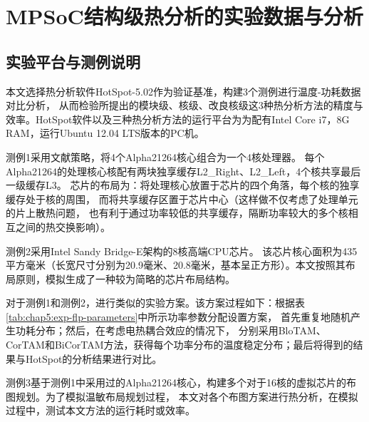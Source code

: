 

\chapter{MPSoC结构级热分析的实验数据与分析}
\label{cha:SSTAexperiments}

\section{实验平台与测例说明}
本文选择热分析软件HotSpot-5.02作为验证基准，构建3个测例进行温度-功耗数据对比分析， 从而检验所提出的模块级、核级、改良核级这3种热分析方法的精度与效率。HotSpot软件以及三种热分析方法的运行平台为为配有Intel Core i7，8G RAM，运行Ubuntu 12.04 LTS版本的PC机。

测例1采用文献策略，将4个Alpha21264核心组合为一个4核处理器。 每个Alpha21264的处理核心核配有两块独享缓存L2\_Right、L2\_Left，4个核共享最后一级缓存L3。 芯片的布局为：将处理核心放置于芯片的四个角落，每个核的独享缓存处于核的周围， 而将共享缓存区置于芯片中心（这样做不仅考虑了处理单元的片上散热问题， 也有利于通过功率较低的共享缓存，隔断功率较大的多个核相互之间的热交换影响）。

测例2采用Intel Sandy Bridge-E架构的8核高端CPU芯片。 该芯片核心面积为435平方毫米（长宽尺寸分别为20.9毫米、20.8毫米，基本呈正方形）。本文按照其布局原则，模拟生成了一种较为简略的芯片布局结构。

对于测例1和测例2，进行类似的实验方案。该方案过程如下：根据表\ref{tab:chap5:exp-flp-parameters}中所示功率参数分配设置方案， 首先重复地随机产生功耗分布；然后，在考虑电热耦合效应的情况下， 分别采用BloTAM、CorTAM和BiCorTAM方法，获得每个功率分布的温度稳定分布；最后将得到的结果与HotSpot的分析结果进行对比。

测例3基于测例1中采用过的Alpha21264核心，构建多个对于16核的虚拟芯片的布图规划。为了模拟温敏布局规划过程， 本文对各个布图方案进行热分析，在模拟过程中，测试本文方法的运行耗时或效率。

